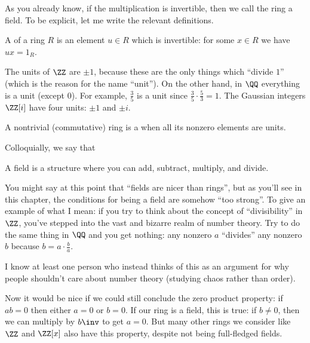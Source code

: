 As you already know, if the multiplication is invertible,
then we call the ring a field.
To be explicit, let me write the relevant definitions.

\begin{definition}
	A  of a ring $R$
	is an element $u \in R$ which is invertible:
	for some $x \in R$ we have $ux = 1_R$.
\end{definition}
\begin{example}
	\listhack
	\begin{enumerate}[(a)]
	\ii The units of $\ZZ$ are $\pm 1$,
	because these are the only things which ``divide $1$''
	(which is the reason for the name ``unit'').
	\ii On the other hand, in $\QQ$ everything is a unit (except $0$).
	For example, $\frac 35$ is a unit since
	$\frac 35 \cdot \frac 53 = 1$.
	\ii The Gaussian integers $\ZZ[i]$ have four units:
	$\pm 1$ and $\pm i$.
	\end{enumerate}
\end{example}

\begin{definition}
	A nontrivial (commutative) ring is a 
	when all its nonzero elements are units.
\end{definition}

Colloquially, we say that
\begin{moral}
A field is a structure where you can add, subtract, multiply, and divide.
\end{moral}

\begin{remark}
	You might say at this point that ``fields are nicer than rings'',
	but as you'll see in this chapter, the conditions for
	being a field are somehow ``too strong''.
	To give an example of what I mean:
	if you try to think about the concept of ``divisibility''
	in $\ZZ$, you've stepped into the vast and bizarre realm of
	number theory.  Try to do the same thing in $\QQ$ and you get nothing:
	any nonzero $a$ ``divides'' any nonzero $b$
	because $b = a \cdot \frac ba$.

	I know at least one person who instead
	thinks of this as an argument for why people
	shouldn't care about number theory
	(studying chaos rather than order).
\end{remark}

Now it would be nice if we could still conclude the zero product property:
if $ab = 0$ then either $a = 0$ or $b = 0$.
If our ring is a field, this is true: if $b \neq 0$,
then we can multiply by $b\inv$ to get $a = 0$.
But many other rings we consider like $\ZZ$ and $\ZZ[x]$ also have this property,
despite not being full-fledged fields.

